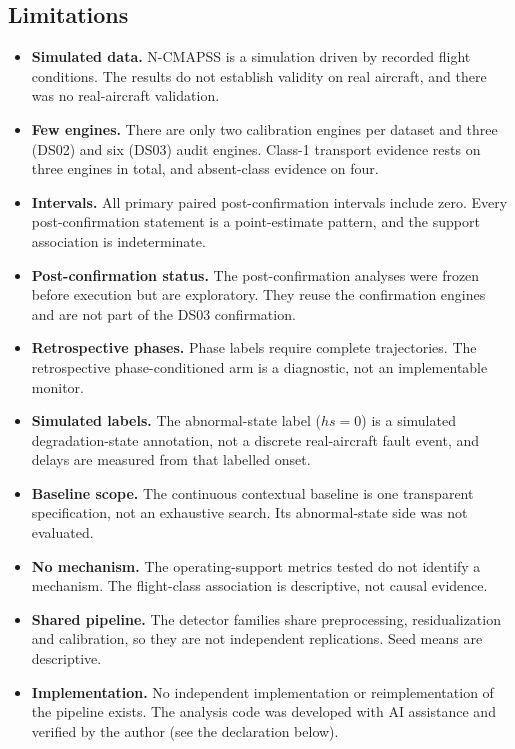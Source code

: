 \documentclass[preprint,11pt,a4paper]{elsarticle}
\begin{document}
\subsection{Limitations}
\begin{itemize}
\item \textbf{Simulated data.} N-CMAPSS is a simulation driven by recorded flight conditions. The results do not establish validity on real aircraft, and there was no real-aircraft validation.
\item \textbf{Few engines.} There are only two calibration engines per dataset and three (DS02) and six (DS03) audit engines. Class-1 transport evidence rests on three engines in total, and absent-class evidence on four.
\item \textbf{Intervals.} All primary paired post-confirmation intervals include zero. Every post-confirmation statement is a point-estimate pattern, and the support association is indeterminate.
\item \textbf{Post-confirmation status.} The post-confirmation analyses were frozen before execution but are exploratory. They reuse the confirmation engines and are not part of the DS03 confirmation.
\item \textbf{Retrospective phases.} Phase labels require complete trajectories. The retrospective phase-conditioned arm is a diagnostic, not an implementable monitor.
\item \textbf{Simulated labels.} The abnormal-state label ($hs = 0$) is a simulated degradation-state annotation, not a discrete real-aircraft fault event, and delays are measured from that labelled onset.
\item \textbf{Baseline scope.} The continuous contextual baseline is one transparent specification, not an exhaustive search. Its abnormal-state side was not evaluated.
\item \textbf{No mechanism.} The operating-support metrics tested do not identify a mechanism. The flight-class association is descriptive, not causal evidence.
\item \textbf{Shared pipeline.} The detector families share preprocessing, residualization and calibration, so they are not independent replications. Seed means are descriptive.
\item \textbf{Implementation.} No independent implementation or reimplementation of the pipeline exists. The analysis code was developed with AI assistance and verified by the author (see the declaration below).
\end{itemize}
\end{document}
